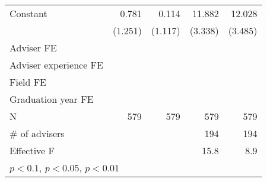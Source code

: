 {\begin{tabular}{l*{4}{D{.}{.}{-1}}}
\addlinespace
Constant                      	&          0.781         	&          0.114         	&         11.882\sym{***}	&         12.028\sym{***}\\
                              	&        (1.251)         	&        (1.117)         	&        (3.338)         	&        (3.485)         \\
\addlinespace
Adviser FE                    	&     \checkmark         	&     \checkmark         	&     \checkmark         	&     \checkmark         \\
\addlinespace
Adviser experience FE         	&     \checkmark         	&     \checkmark         	&     \checkmark         	&     \checkmark         \\
\addlinespace
Field FE                      	&     \checkmark         	&     \checkmark         	&     \checkmark         	&     \checkmark         \\
\addlinespace
Graduation year FE            	&     \checkmark         	&     \checkmark         	&     \checkmark         	&     \checkmark         \\
\midrule
N                             	&            579         	&            579         	&            579         	&            579         \\
\# of advisers                	&                        	&                        	&            194         	&            194         \\
Effective F                   	&                        	&                        	&           15.8         	&            8.9         \\
\bottomrule
{}\\
\end{tabular}
}
